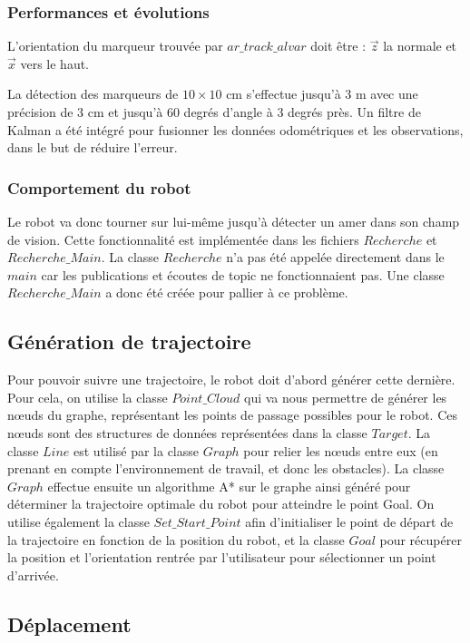 \documentclass[10pt,a4paper]{article}
\begin{document}
\subsubsection{Performances et évolutions}
L'orientation du marqueur trouvée par $ar\_track\_alvar$ doit être : $\vec{z}$ la normale et $\vec{x}$ vers le haut.
	
La détection des marqueurs de $10 \times 10$ cm s'effectue jusqu'à 3 m  avec une précision de 3 cm et jusqu'à 60 degrés d'angle à 3 degrés près. Un filtre de Kalman a été intégré pour fusionner les données odométriques et les observations, dans le but de réduire l'erreur.

\subsubsection{Comportement du robot}
Le robot va donc tourner sur lui-même jusqu'à détecter un amer dans son champ de vision. Cette fonctionnalité est implémentée dans les fichiers $Recherche$ et $Recherche\_Main$. La classe $Recherche$ n'a pas été appelée directement dans le $main$ car les publications et écoutes de topic ne fonctionnaient pas. Une classe $Recherche\_Main$ a donc été créée pour pallier à ce problème.


\subsection{Génération de trajectoire}
\label{sec:generation}

Pour pouvoir suivre une trajectoire, le robot doit d'abord générer cette dernière. Pour cela, on utilise la classe $Point\_Cloud$ qui va nous permettre de générer les nœuds du graphe, représentant les points de passage possibles pour le robot. Ces nœuds sont des structures de données représentées dans la classe $Target$. La classe $Line$ est utilisé par la classe $Graph$ pour relier les nœuds entre eux (en prenant en compte l'environnement de travail, et donc les obstacles). La classe $Graph$ effectue ensuite un algorithme A* sur le graphe ainsi généré pour déterminer la trajectoire optimale du robot pour atteindre le point Goal. On utilise également la classe $Set\_Start\_Point$ afin d'initialiser le point de départ de la trajectoire en fonction de la position du robot, et la classe $Goal$ pour récupérer la position et l'orientation rentrée par l'utilisateur pour sélectionner un point d'arrivée.


\subsection{Déplacement}
\label{sec:deplacement}
\end{document}
